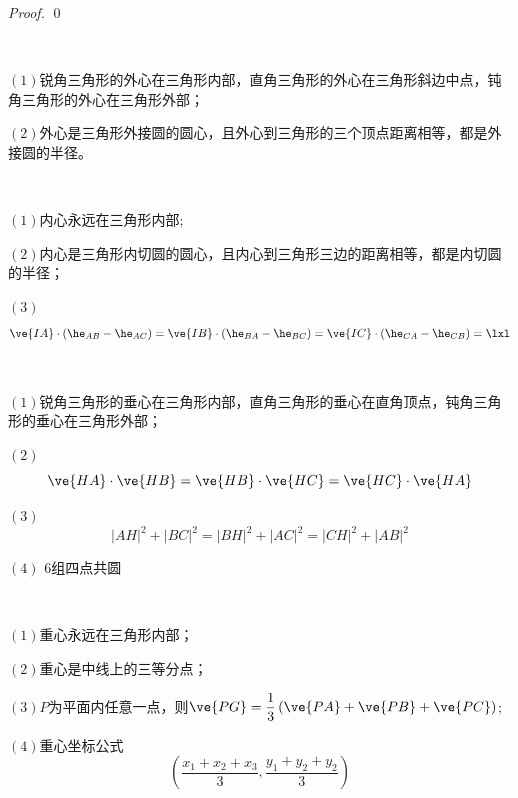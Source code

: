 \begin{proof}
    \qed
\end{proof}
\begin{character}[外心的性质]
    \                     

    \((1)\)锐角三角形的外心在三角形内部，直角三角形的外心在三角形斜边中点，钝角三角形的外心在三角形外部；

    \((2)\)外心是三角形外接圆的圆心，且外心到三角形的三个顶点距离相等，都是外接圆的半径。
\end{character}

\begin{character}[内心的性质]
    \

    \((1)\)内心永远在三角形内部;

    \((2)\)内心是三角形内切圆的圆心，且内心到三角形三边的距离相等，都是内切圆的半径；
    
    \((3)\)\[\ve{IA}\cdot(\he_{AB}-\he_{AC})=\ve{IB}\cdot(\he_{BA}-\he_{BC})=\ve{IC}\cdot(\he_{CA}-\he_{CB})=\lxl\]

\end{character}

\begin{character}[垂心的性质]
    \ 

    \((1)\)锐角三角形的垂心在三角形内部，直角三角形的垂心在直角顶点，钝角三角形的垂心在三角形外部；

    \((2)\)\[\ve{HA}\cdot\ve{HB}=\ve{HB}\cdot\ve{HC}=\ve{HC}\cdot\ve{HA}\]

    \((3)\)\[|AH|^2+|BC|^2=|BH|^2+|AC|^2=|CH|^2+|AB|^2\]

    \((4)\) \(6\)组四点共圆
\end{character}

\begin{character}[重心的性质]
    \

    \((1)\)重心永远在三角形内部；

    \((2)\)重心是中线上的三等分点；

    \((3)\)\(P\)为平面内任意一点，则\(\ve{PG}=\dfrac{1}{3}\left(\ve{PA}+\ve{PB}+\ve{PC}\right)\);

    \((4)\)重心坐标公式\[\left(\dfrac{x_1+x_2+x_3}{3},\dfrac{y_1+y_2+y_2}{3}\right)\]
\end{character}



